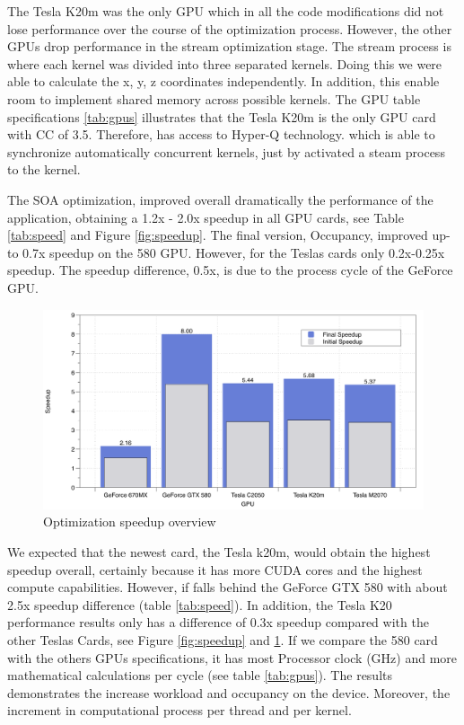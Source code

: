 The Tesla K20m was the only GPU which in all the code modifications did not lose performance over the course of the optimization process. However, the other GPUs drop performance in the stream optimization stage. The stream process is where each kernel was divided into three separated kernels. Doing this we were able to calculate the x, y, z coordinates independently. In addition, this enable room to implement shared memory across possible kernels. The GPU table specifications \ref{tab:gpus} illustrates that the Tesla K20m is the only GPU card with CC of 3.5. Therefore, has access to Hyper-Q technology. which is able to synchronize automatically concurrent kernels, just by activated a steam process to the kernel.

The SOA optimization, improved overall dramatically the performance of the application, obtaining a 1.2x - 2.0x speedup in all GPU cards, see Table \ref{tab:speed} and Figure \ref{fig:speedup}. The final version, Occupancy, improved up-to 0.7x speedup on the 580 GPU. However, for the Teslas cards only 0.2x-0.25x speedup. The speedup difference, 0.5x,  is due to the process cycle of the GeForce GPU. 

\begin{figure}[htbp]
	\centering
		\includegraphics[width=1.0\textwidth]{Figures/speed.png}
		\smallskip
	\caption[Optimization speedup overview]{Optimization speedup overview}
	\label{fig:speeduplast}
\end{figure}


We expected that the newest card, the Tesla k20m, would obtain the highest speedup overall, certainly because it has more CUDA cores and the highest compute capabilities. However, if falls behind the GeForce GTX 580 with about 2.5x speedup difference (table \ref{tab:speed}). In addition, the Tesla K20 performance results only has a difference of 0.3x speedup compared with the other Teslas Cards, see Figure \ref{fig:speedup} and \ref{fig:speeduplast}. If we compare the 580 card with the others GPUs specifications, it has most Processor clock (GHz) and more mathematical calculations per cycle (see table \ref{tab:gpus}). The results demonstrates the increase workload and occupancy on the device. Moreover, the increment in computational process per thread and per kernel.


